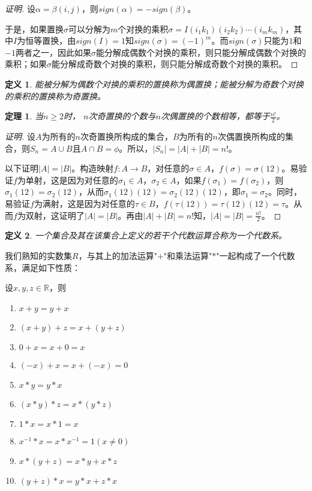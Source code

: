 \documentclass{book}[oneside]
\newtheorem{Def}{定义}[chapter]
\newtheorem{Thm}{定理}[chapter]
\begin{document}
\begin{CJK*}{UTF8}{gbsn}
\begin{proof}[证明]
设$\alpha = \beta (i,j)$，则$sign(\alpha) = -sign(\beta)$。

于是，如果置换$\sigma$可以分解为$m$个对换的乘积$\sigma = I(i_1k_1)(i_2k_2)\cdots (i_mk_m)$，其中$I$为恒等置换，由$sign(I)=1$知$sign(\sigma) = (-1)^m$。而$sign(\sigma)$只能为$1$和$-1$两者之一，因此如果$\sigma$能分解成偶数个对换的乘积，则只能分解成偶数个对换的乘积；如果$\sigma$能分解成奇数个对换的乘积，则只能分解成奇数个对换的乘积。
  \end{proof}
  \begin{Def}
    能被分解为偶数个对换的乘积的置换称为偶置换；能被分解为奇数个对换的乘积的置换称为奇置换。
  \end{Def}
    \begin{Thm}
    当$n \geq 2$时， $n$次奇置换的个数与$n$次偶置换的个数相等，都等于$\frac{n!}{2}$。
  \end{Thm}
     \begin{proof}[证明]
     设$A$为所有的$n$次奇置换所构成的集合，$B$为所有的$n$次偶置换所构成的集合，则$S_n=A\cup B$且$A\cap B=\phi$。所以，$|S_n|=|A| + |B|=n!$。

     以下证明$|A|=|B|$。构造映射$f:A\to B$，对任意的$\sigma\in A$，$f(\sigma) = \sigma(12)$。易验证$f$为单射，这是因为对任意的$\sigma_1\in A$，$\sigma_2\in A$，如果$f(\sigma_1)=f(\sigma_2)$，则$\sigma_1(12)=\sigma_2(12)$，从而$\sigma_1(12)(12)=\sigma_2(12)(12)$，即$\sigma_1=\sigma_2$。同时，易验证$f$为满射，这是因为对任意的$\tau \in B$，$f(\tau(12))=\tau(12)(12)=\tau$。从而$f$为双射，这证明了$|A|=|B|$。再由$|A|+|B|=n!$知，$|A|=|B|=\frac{n!}{2}$。
   \end{proof}

      \begin{Def}
    一个集合及其在该集合上定义的若干个代数运算合称为一个代数系。
  \end{Def}
  我们熟知的实数集$R$，与其上的加法运算"$+$"和乘法运算"$*$"一起构成了一个代数系，满足如下性质：
  
    设$x, y, z \in \mathbb{R}$，则
   \begin{enumerate}
   \item   $x + y = y + x$
   \item   $(x + y) + z = x + (y + z)$
   \item   $0 + x = x + 0 = x$
   \item   $(-x) + x =x + (-x) = 0$
   \item   $x * y = y * x$
   \item   $(x * y) * z = x * (y *z)$
   \item   $1 * x = x * 1 = x$
   \item   $x^{-1} * x = x * x^{-1} = 1 (x \neq 0)$
   \item   $x* (y + z) = x * y + x * z$
   \item   $(y + z) * x = y * x + z * x$
    \end{enumerate}


\end{CJK*}
\end{document}
